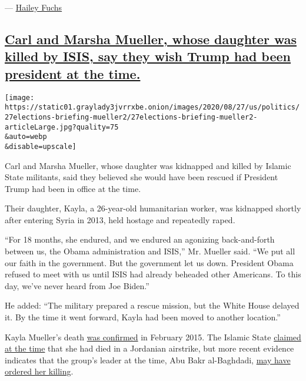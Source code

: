 --- \href{https://www.nytimes3xbfgragh.onion/by/hailey-fuchs}{Hailey
Fuchs}

\hypertarget{carl-and-marsha-mueller-whose-daughter-was-killed-by-isis-say-they-wish-trump-had-been-president-at-the-time}{%
\subsection{\texorpdfstring{\protect\hyperlink{carl-and-marsha-mueller-whose-daughter-was-killed-by-isis-say-they-wish-trump-had-been-president-at-the-time}{Carl
and Marsha Mueller, whose daughter was killed by ISIS, say they wish
Trump had been president at the
time.}}{Carl and Marsha Mueller, whose daughter was killed by ISIS, say they wish Trump had been president at the time.}}\label{carl-and-marsha-mueller-whose-daughter-was-killed-by-isis-say-they-wish-trump-had-been-president-at-the-time}}

\texttt{[image: https://static01.graylady3jvrrxbe.onion/images/2020/08/27/us/politics/27elections-briefing-mueller2/27elections-briefing-mueller2-articleLarge.jpg?quality=75\\\&auto=webp\\\&disable=upscale]}

Carl and Marsha Mueller, whose daughter was kidnapped and killed by
Islamic State militants, said they believed she would have been rescued
if President Trump had been in office at the time.

Their daughter, Kayla, a 26-year-old humanitarian worker, was kidnapped
shortly after entering Syria in 2013, held hostage and repeatedly raped.

``For 18 months, she endured, and we endured an agonizing back-and-forth
between us, the Obama administration and ISIS,'' Mr. Mueller said. ``We
put all our faith in the government. But the government let us down.
President Obama refused to meet with us until ISIS had already beheaded
other Americans. To this day, we've never heard from Joe Biden.''

He added: ``The military prepared a rescue mission, but the White House
delayed it. By the time it went forward, Kayla had been moved to another
location.''

Kayla Mueller's death
\href{https://www.nytimes3xbfgragh.onion/2015/02/11/world/middleeast/parents-of-kayla-mueller-isis-hostage-confirm-she-is-dead.html}{was
confirmed} in February 2015. The Islamic State
\href{https://www.nytimes3xbfgragh.onion/2015/02/07/world/middleeast/isis-claims-american-hostage-killed-by-jordanian-retaliation-bombings.html}{claimed
at the time} that she had died in a Jordanian airstrike, but more recent
evidence indicates that the group's leader at the time, Abu Bakr
al-Baghdadi,
\href{https://www.nytimes3xbfgragh.onion/2019/11/12/us/politics/kayla-mueller-baghdadi.html}{may
have ordered her killing}.

